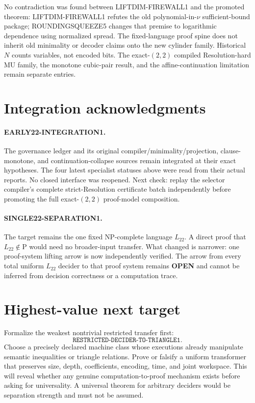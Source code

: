 \documentclass[11pt]{article}
\newcommand{\Ltw}{L_{22}}
\newcommand{\OPEN}{\textbf{OPEN}}
\begin{document}
No contradiction was found between LIFTDIM-FIREWALL1 and the promoted theorem:
LIFTDIM-FIREWALL1 refutes the old polynomial-in-$\nu$ sufficient-bound package;
ROUNDINGSQUEEZE5 changes that premise to logarithmic dependence using normalized
spread.  The fixed-language proof spine does not inherit old minimality or decoder
claims onto the new cylinder family.  Historical $N$ counts variables, not encoded
bits.  The exact-$(2,2)$ compiled Resolution-hard MU family, the monotone cubic-pair
result, and the affine-continuation limitation remain separate entries.

\section{Integration acknowledgments}
\paragraph{EARLY22-INTEGRATION1.}
The governance ledger and its original compiler/minimality/projection,
clause-monotone, and continuation-collapse sources remain integrated at their exact
hypotheses.  The four latest specialist statuses above were read from their actual
reports.  No closed interface was reopened.  Next check: replay the selector compiler's
complete strict-Resolution certificate batch independently before promoting the full
exact-$(2,2)$ proof-model composition.

\paragraph{SINGLE22-SEPARATION1.}
The target remains the one fixed NP-complete language $\Ltw$.  A direct proof that
$\Ltw\notin\mathrm P$ would need no broader-input transfer.  What changed is narrower:
one proof-system lifting arrow is now independently verified.  The arrow from every
total uniform $\Ltw$ decider to that proof system remains \OPEN{} and cannot be
inferred from decision correctness or a computation trace.

\section{Highest-value next target}
Formalize the weakest nontrivial restricted transfer first:
\[
 \texttt{RESTRICTED-DECIDER-TO-TRIANGLE1}.
\]
Choose a precisely declared machine class whose executions already manipulate
semantic inequalities or triangle relations.  Prove or falsify a uniform transformer
that preserves size, depth, coefficients, encoding, time, and joint workspace.  This
will reveal whether any genuine computation-to-proof mechanism exists before asking
for universality.  A universal theorem for arbitrary deciders would be separation
strength and must not be assumed.
\end{document}
